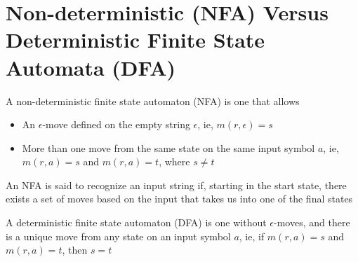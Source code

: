 \documentclass[8pt,a4paper,compress]{beamer}
\begin{document}
\section{Non-deterministic (NFA) Versus Deterministic Finite State Automata (DFA)}
\begin{frame}[fragile]
\pause

A non-deterministic finite state automaton (NFA) is one that allows
\begin{itemize}
\pause
\item An $\epsilon$-move defined on the empty string $\epsilon$, ie, $m(r, \epsilon) = s$

\pause
\item More than one move from the same state on the same input symbol $a$, ie, $m(r, a) = s$ and $m(r, a) = t$, \noindent where $s \neq t$
\end{itemize}

\pause\bigskip

An NFA is said to recognize an input string if, starting in the start state, there exists a set of moves based on the input that takes us into one of the final states

\pause\bigskip

A deterministic finite state automaton (DFA) is one without $\epsilon$-moves, and there is a unique move from any state on an input symbol $a$, ie, if $m(r, a) = s$ and $m(r, a) = t$, then $s = t$
\end{frame}
\end{document}
